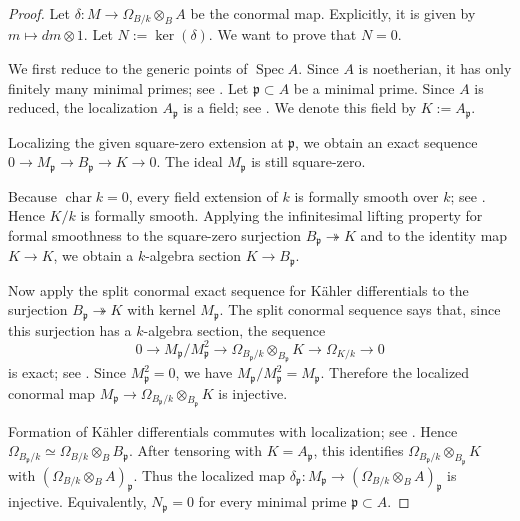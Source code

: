 \documentclass[11pt,twoside]{amsart}
\theoremstyle{plain}
\numberwithin{equation}{section}
\theoremstyle{definition}
\begin{document}
\begin{proof}
Let \(\delta:M\to \Omega_{B/k}\otimes_B A\) be the conormal map. Explicitly, it is given by
\(m\mapsto dm\otimes 1\). Let \(N:=\ker(\delta)\). We want to prove that \(N=0\).

We first reduce to the generic points of \(\operatorname{Spec}A\). Since \(A\) is noetherian,
it has only finitely many minimal primes; see \cite[Algebra, Lemma 10.31.6]{stacks-project}.
Let \(\mathfrak p\subset A\) be a minimal prime. Since \(A\) is reduced, the localization
\(A_{\mathfrak p}\) is a field; see \cite[Algebra, Lemma 10.25.1]{stacks-project}. We denote
this field by \(K:=A_{\mathfrak p}\).

Localizing the given square-zero extension at \(\mathfrak p\), we obtain an exact sequence
\(0\to M_{\mathfrak p}\to B_{\mathfrak p}\to K\to 0\).
The ideal \(M_{\mathfrak p}\) is still square-zero.

Because \(\operatorname{char}k=0\), every field extension of \(k\) is formally smooth over
\(k\); see \cite[Algebra, Lemma 10.158.8]{stacks-project}. Hence \(K/k\) is formally
smooth. Applying the infinitesimal lifting property for formal smoothness to the square-zero
surjection \(B_{\mathfrak p}\twoheadrightarrow K\) and to the identity map \(K\to K\), we
obtain a \(k\)-algebra section \(K\to B_{\mathfrak p}\).

Now apply the split conormal exact sequence for Kähler differentials to the surjection
\(B_{\mathfrak p}\twoheadrightarrow K\) with kernel \(M_{\mathfrak p}\). The split conormal
sequence says that, since this surjection has a \(k\)-algebra section, the sequence
\[
    0
    \longrightarrow
    M_{\mathfrak p}/M_{\mathfrak p}^{2}
    \longrightarrow
    \Omega_{B_{\mathfrak p}/k}\otimes_{B_{\mathfrak p}} K
    \longrightarrow
    \Omega_{K/k}
    \longrightarrow 0
\]
is exact; see \cite[Algebra, Lemma 10.131.10]{stacks-project}. Since \(M_{\mathfrak p}^{2}=0\),
we have \(M_{\mathfrak p}/M_{\mathfrak p}^{2}=M_{\mathfrak p}\). Therefore the localized
conormal map \(M_{\mathfrak p}\to \Omega_{B_{\mathfrak p}/k}\otimes_{B_{\mathfrak p}} K\)
is injective.

Formation of Kähler differentials commutes with localization; see
\cite[Algebra, Lemma 10.131.8]{stacks-project}. Hence
\(\Omega_{B_{\mathfrak p}/k}\simeq\Omega_{B/k}\otimes_B B_{\mathfrak p}\).
After tensoring with \(K=A_{\mathfrak p}\), this identifies
\(\Omega_{B_{\mathfrak p}/k}\otimes_{B_{\mathfrak p}} K\) with
\(\left(\Omega_{B/k}\otimes_B A\right)_{\mathfrak p}\). Thus the localized map
\(\delta_{\mathfrak p}:M_{\mathfrak p}\to\left(\Omega_{B/k}\otimes_B A\right)_{\mathfrak p}\)
is injective. Equivalently, \(N_{\mathfrak p}=0\) for every minimal prime
\(\mathfrak p\subset A\).


\end{proof}
\end{document}
